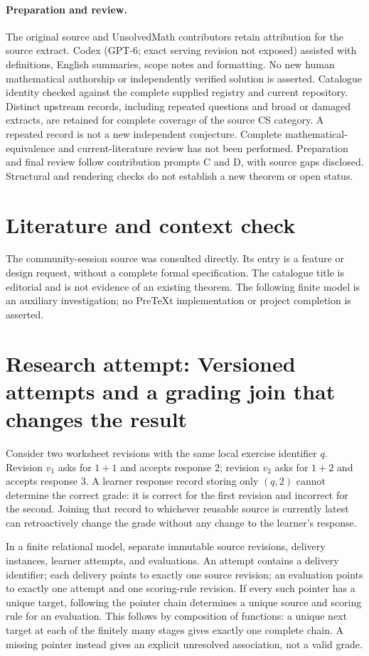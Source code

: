\documentclass[11pt]{article}
\begin{document}
\paragraph{Preparation and review.}
The original source and UnsolvedMath contributors retain attribution for the source extract. Codex (GPT-6; exact serving revision not exposed) assisted with definitions, English summaries, scope notes and formatting. No new human mathematical authorship or independently verified solution is asserted. Catalogue identity checked against the complete supplied registry and current repository. Distinct upstream records, including repeated questions and broad or damaged extracts, are retained for complete coverage of the source CS category. A repeated record is not a new independent conjecture. Complete mathematical-equivalence and current-literature review has not been performed. Preparation and final review follow contribution prompts C and D, with source gaps disclosed. Structural and rendering checks do not establish a new theorem or open status.
\label{end:statement}

\section{Literature and context check}
The community-session source was consulted directly. Its entry is a feature or design request, without a complete formal specification. The catalogue title is editorial and is not evidence of an existing theorem. The following finite model is an auxiliary investigation; no PreTeXt implementation or project completion is asserted.
\section{Research attempt: Versioned attempts and a grading join that changes the result}
Consider two worksheet revisions with the same local exercise identifier $q$. Revision $v_1$ asks for $1+1$ and accepts response 2; revision $v_2$ asks for $1+2$ and accepts response 3. A learner response record storing only $(q,2)$ cannot determine the correct grade: it is correct for the first revision and incorrect for the second. Joining that record to whichever reusable source is currently latest can retroactively change the grade without any change to the learner's response.

In a finite relational model, separate immutable source revisions, delivery instances, learner attempts, and evaluations. An attempt contains a delivery identifier; each delivery points to exactly one source revision; an evaluation points to exactly one attempt and one scoring-rule revision. If every such pointer has a unique target, following the pointer chain determines a unique source and scoring rule for an evaluation. This follows by composition of functions: a unique next target at each of the finitely many stages gives exactly one complete chain. A missing pointer instead gives an explicit unresolved association, not a valid grade.
\end{document}

